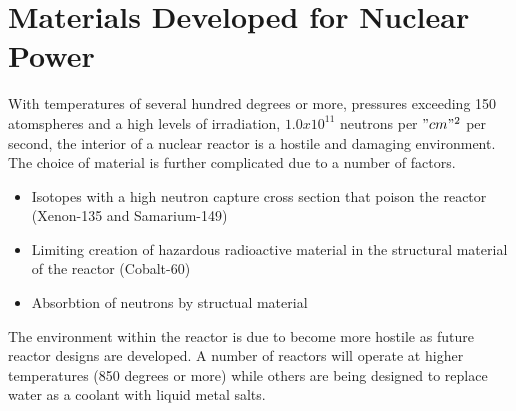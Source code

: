 \section{Materials Developed for Nuclear Power}

With temperatures of several hundred degrees or more, pressures exceeding 150 atomspheres and a high levels of irradiation, $1.0 x10^11$ neutrons per $"cm"^2$ per second, the interior of a nuclear reactor is a hostile and damaging environment.  The choice of material is further complicated due to a number of factors.

\begin{itemize}
\item Isotopes with a high neutron capture cross section that poison the reactor (Xenon-135 and Samarium-149)
\item Limiting creation of hazardous radioactive material in the structural material of the reactor (Cobalt-60)
\item Absorbtion of neutrons by structual material 
\end{itemize}

The environment within the reactor is due to become more hostile as future reactor designs are developed.  A number of reactors will operate at higher temperatures (850 degrees or more) while others are being designed to replace water as a coolant with liquid metal salts.



